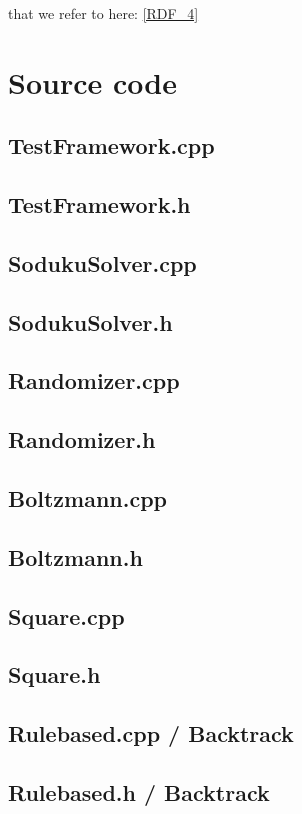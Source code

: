 \documentclass[a4paper,11pt]{kth-mag}
\begin{document}
that we refer to here: \ref{RDF_4}

\chapter{Source code}
\lstset{language=C++}
\section{TestFramework.cpp}

\section{TestFramework.h}


\section{SodukuSolver.cpp}

\section{SodukuSolver.h}


\section{Randomizer.cpp}

\section{Randomizer.h}


\section{Boltzmann.cpp}

\section{Boltzmann.h}


\section{Square.cpp}

\section{Square.h}


\section{Rulebased.cpp / Backtrack}

\section{Rulebased.h / Backtrack}

\end{document}
